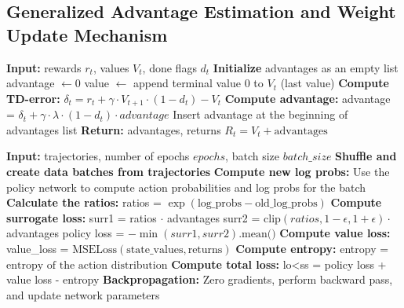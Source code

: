 \subsection{Generalized Advantage Estimation and Weight Update Mechanism}
\begin{algorithmic}
    \State \textbf{Input:} rewards $r_t$, values $V_t$, done flags $d_t$
    \State \textbf{Initialize} advantages as an empty list
    \State advantage $\gets 0$
    \State value $\gets$ append terminal value $0$ to $V_t$ (last value)
        \State \textbf{Compute TD-error:}
        \State \hspace{1em} $\delta_t = r_t + \gamma \cdot V_{t+1} \cdot (1 - d_t) - V_t$
        \State \textbf{Compute advantage:}
        \State \hspace{1em} advantage = $\delta_t + \gamma \cdot \lambda \cdot (1 - d_t) \cdot advantage$
        \State \hspace{1em} Insert advantage at the beginning of advantages list
    \EndFor
    \State \textbf{Return:} advantages, returns $R_t = V_t + \text{advantages}$
\end{algorithmic}

\begin{algorithmic}
    \State \textbf{Input:} trajectories, number of epochs $epochs$, batch size $batch\_size$
        \State \textbf{Shuffle and create data batches from trajectories}
            \State \textbf{Compute new log probs:}
            \State \hspace{1em} Use the policy network to compute action probabilities and log probs for the batch
            \State \textbf{Calculate the ratios:}
            \State \hspace{1em} ratios = $\exp(\text{log\_probs} - \text{old\_log\_probs})$
            \State \textbf{Compute surrogate loss:}
            \State \hspace{1em} surr1 = ratios $\cdot$ advantages
            \State \hspace{1em} surr2 = $\text{clip}(ratios, 1 - \epsilon, 1 + \epsilon) \cdot$ advantages
            \State \hspace{1em} policy loss = $-\min(surr1, surr2) \text{.mean()}$
            \State \textbf{Compute value loss:}
            \State \hspace{1em} value\_loss = $\text{MSELoss}(\text{state\_values}, \text{returns})$
            \State \textbf{Compute entropy:}
            \State \hspace{1em} entropy = $\text{entropy of the action distribution}$
            \State \textbf{Compute total loss:}
            \State \hspace{1em} lo<ss = policy loss + value loss -  \cdot entropy
            \State \textbf{Backpropagation:}
            \State \hspace{1em} Zero gradients, perform backward pass, and update network parameters
        \EndFor
    \EndFor
\end{algorithmic}
